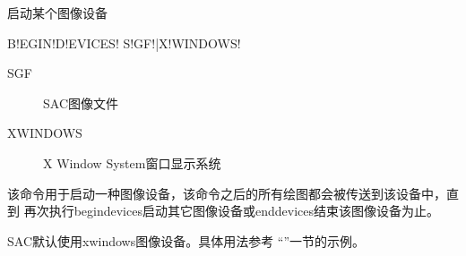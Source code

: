 \label{cmd:begindevices}

启动某个图像设备

\begin{SACSTX}
B!EGIN!D!EVICES! S!GF!|X!WINDOWS!
\end{SACSTX}

\begin{description}
\item [SGF] SAC图像文件
\item [XWINDOWS] X Window System窗口显示系统
\end{description}

该命令用于启动一种图像设备，该命令之后的所有绘图都会被传送到该设备中，直到
再次执行begindevices启动其它图像设备或enddevices结束该图像设备为止。

SAC默认使用xwindows图像设备。具体用法参考 ``''一节的示例。
